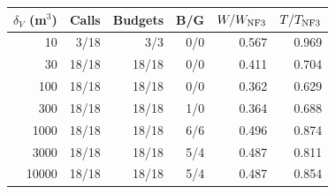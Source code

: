 \begin{tabular}{rrrrrr}
\toprule
$\delta_V$ (m$^3$) & Calls & Budgets & B/G & $W/W_{\rm NF3}$ & $T/T_{\rm NF3}$\\
\midrule
10 & 3/18 & 3/3 & 0/0 & 0.567 & 0.969\\
30 & 18/18 & 18/18 & 0/0 & 0.411 & 0.704\\
100 & 18/18 & 18/18 & 0/0 & 0.362 & 0.629\\
300 & 18/18 & 18/18 & 1/0 & 0.364 & 0.688\\
1000 & 18/18 & 18/18 & 6/6 & 0.496 & 0.874\\
3000 & 18/18 & 18/18 & 5/4 & 0.487 & 0.811\\
10000 & 18/18 & 18/18 & 5/4 & 0.487 & 0.854\\
\bottomrule
\end{tabular}
